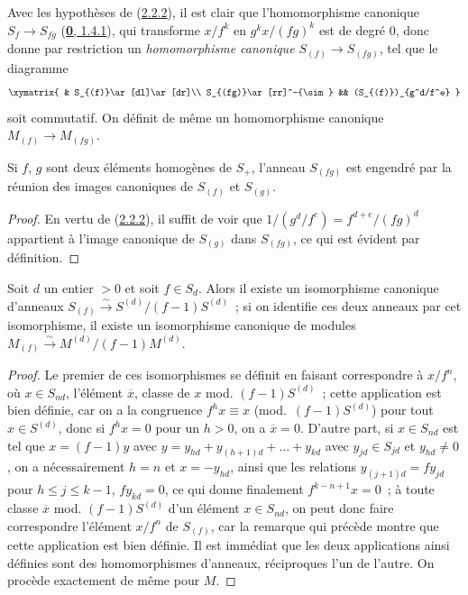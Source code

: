 \begin{env}[2.2.3]
\label{II.2.2.3-fr}
Avec les hypothèses de (\hyperref[II.2.2.2-fr]{2.2.2}), il est clair que
l'homomorphisme canonique $S_f\to S_{fg}$
(\hyperref[0.1.4.1-fr]{\textbf{0}, 1.4.1}), qui transforme $x/f^k$ en
$g^k x/(fg)^k$ est de degré $0$, donc donne par restriction un
\emph{homomorphisme canonique $S_{(f)}\to S_{(fg)}$}, tel que le diagramme
\[
  \xymatrix{
    & S_{(f)}\ar[dl]\ar[dr]\\
    S_{(fg)}\ar[rr]^-{\sim} && (S_{(f)})_{g^d/f^e}
  }
\]
soit commutatif. On définit de même un homomorphisme canonique
$M_{(f)}\to M_{(fg)}$.
\end{env}

\begin{lemma}[2.2.4]
\label{II.2.2.4-fr}
Si $f$, $g$ sont deux éléments homogènes de $S_+$, l'anneau $S_{(fg)}$ est
engendré par la réunion des images canoniques de $S_{(f)}$ et $S_{(g)}$.
\end{lemma}

\begin{proof}
En vertu de (\hyperref[II.2.2.2-fr]{2.2.2}), il suffit de voir que
$1/(g^d/f^e)=f^{d+e}/(fg)^d$ appartient à l'image canonique de $S_{(g)}$
dans $S_{(fg)}$, ce qui est évident par définition.
\end{proof}

\begin{proposition}[2.2.5]
\label{II.2.2.5-fr}
Soit $d$ un entier $>0$ et soit $f\in S_d$. Alors il existe un isomorphisme
canonique d'anneaux
$S_{(f)}\xrightarrow{\sim}S^{(d)}/(f-1)S^{(d)}$~; si on identifie ces deux
anneaux par cet isomorphisme, il existe un isomorphisme canonique de modules
$M_{(f)}\xrightarrow{\sim}M^{(d)}/(f-1)M^{(d)}$.
\end{proposition}

\begin{proof}
Le premier de ces isomorphismes se définit en faisant correspondre à
$x/f^n$, où $x\in S_{nd}$, l'élément $\overline{x}$, classe de $x$ mod.
$(f-1)S^{(d)}$~; cette application est bien définie, car on a la congruence
$f^h x\equiv x$ (mod.~$(f-1)S^{(d)}$) pour tout $x\in S^{(d)}$, donc si
$f^h x=0$ pour un $h>0$,
on a $\overline{x}=0$. D'autre part, si $x\in S_{nd}$ est tel que
$x=(f-1)y$ avec
$y=y_{hd}+y_{(h+1)d}+\ldots+y_{kd}$ avec $y_{jd}\in S_{jd}$ et
$y_{hd}\neq 0$, on a nécessairement $h=n$ et $x=-y_{hd}$, ainsi que les
relations $y_{(j+1)d}=fy_{jd}$ pour $h\leq j\leq k-1$, $fy_{kd}=0$, ce qui
donne finalement $f^{k-n+1}x=0$~; à toute classe $\overline{x}$ mod.
$(f-1)S^{(d)}$ d'un élément $x\in S_{nd}$, on peut donc faire correspondre
l'élément $x/f^n$ de $S_{(f)}$, car la remarque qui précède montre que cette
application est bien définie. Il est immédiat que les deux applications ainsi
définies sont des homomorphismes d'anneaux, réciproques l'un de l'autre. On
procède exactement de même pour $M$.
\end{proof}

